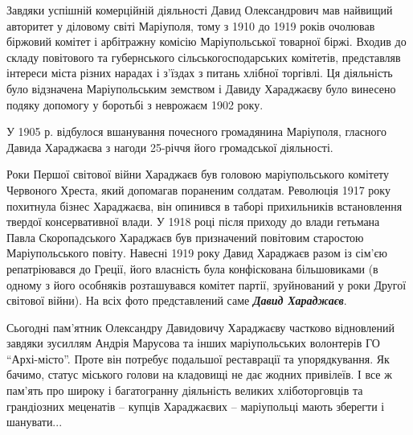 Завдяки успішній комерційній діяльності Давид Олександрович мав найвищий
авторитет у діловому світі Маріуполя, тому з 1910 до 1919 років очолював
біржовий комітет і арбітражну комісію Маріупольської товарної біржі. Входив до
складу повітового та губернського сільськогосподарських комітетів, представляв
інтереси міста різних нарадах і з'їздах з питань хлібної торгівлі. Ця
діяльність було відзначена Маріупольським земством і Давиду Хараджаєву було
винесено подяку допомогу у боротьбі з неврожаєм 1902 року.

У 1905 р. відбулося вшанування почесного громадянина Маріуполя, гласного Давида
Хараджаєва з нагоди 25-річчя його громадської діяльності.

Роки Першої світової війни Хараджаєв був головою маріупольського комітету
Червоного Хреста, який допомагав пораненим солдатам. Революція 1917 року
похитнула бізнес Хараджаєва, він опинився в таборі прихильників встановлення
твердої консервативної влади. У 1918 році після приходу до влади гетьмана Павла
Скоропадського Хараджаєв був призначений повітовим старостою Маріупольського
повіту. Навесні 1919 року Давид Хараджаєв разом із сім'єю репатріювався до
Греції, його власність була конфіскована більшовиками (в одному з його
особняків розташувався комітет партії, зруйнований у роки Другої світової
війни). На всіх фото представлений саме \emph{\textbf{Давид Хараджаєв}}.


Сьогодні пам'ятник Олександру Давидовичу Хараджаєву частково відновлений
завдяки зусиллям Андрія Марусова та інших маріупольських волонтерів ГО
\enquote{Архі-місто}. Проте він потребує подальшої реставрації та упорядкування. Як
бачимо, статус міського голови на кладовищі не дає жодних привілеїв. І все ж
пам'ять про широку і багатогранну діяльність великих хліботорговців та
грандіозних меценатів – купців Хараджаєвих – маріупольці мають зберегти і
шанувати...
